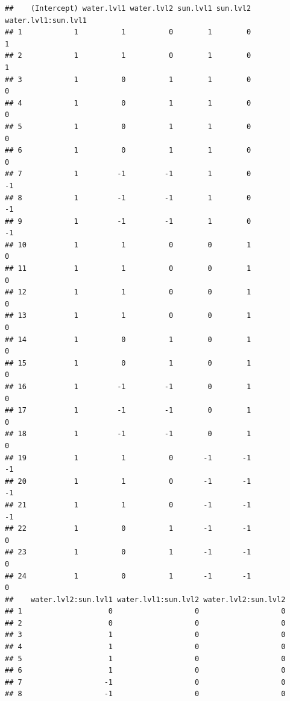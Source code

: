 \documentclass[
]{book}
\begin{document}
\begin{verbatim}
##    (Intercept) water.lvl1 water.lvl2 sun.lvl1 sun.lvl2 water.lvl1:sun.lvl1
## 1            1          1          0        1        0                   1
## 2            1          1          0        1        0                   1
## 3            1          0          1        1        0                   0
## 4            1          0          1        1        0                   0
## 5            1          0          1        1        0                   0
## 6            1          0          1        1        0                   0
## 7            1         -1         -1        1        0                  -1
## 8            1         -1         -1        1        0                  -1
## 9            1         -1         -1        1        0                  -1
## 10           1          1          0        0        1                   0
## 11           1          1          0        0        1                   0
## 12           1          1          0        0        1                   0
## 13           1          1          0        0        1                   0
## 14           1          0          1        0        1                   0
## 15           1          0          1        0        1                   0
## 16           1         -1         -1        0        1                   0
## 17           1         -1         -1        0        1                   0
## 18           1         -1         -1        0        1                   0
## 19           1          1          0       -1       -1                  -1
## 20           1          1          0       -1       -1                  -1
## 21           1          1          0       -1       -1                  -1
## 22           1          0          1       -1       -1                   0
## 23           1          0          1       -1       -1                   0
## 24           1          0          1       -1       -1                   0
##    water.lvl2:sun.lvl1 water.lvl1:sun.lvl2 water.lvl2:sun.lvl2
## 1                    0                   0                   0
## 2                    0                   0                   0
## 3                    1                   0                   0
## 4                    1                   0                   0
## 5                    1                   0                   0
## 6                    1                   0                   0
## 7                   -1                   0                   0
## 8                   -1                   0                   0

\end{verbatim}
\end{document}
